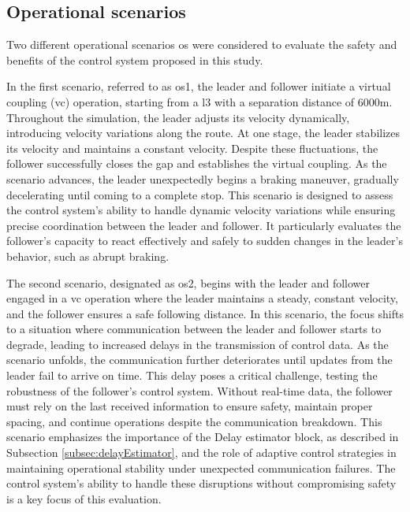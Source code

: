 \documentclass[letterpaper, 10 pt, conference]{ieeeconf}
\theoremstyle{definition}
\theoremstyle{nopoint}
\begin{document}
  		
  
  




 \subsection{Operational scenarios}
  \label{sec:OperationalScenarios}
  
  Two different operational scenarios \gls{os} were considered to evaluate the safety and benefits of the control system proposed in this study. 
  
  In the first scenario, referred to as \gls{os}1, the leader and follower initiate a virtual coupling (\gls{vc}) operation, starting from a \gls{l3} with a separation distance of $6000\unit{\meter}$. Throughout the simulation, the leader adjusts its velocity dynamically, introducing velocity variations along the route. At one stage, the leader stabilizes its velocity and maintains a constant velocity. Despite these fluctuations, the follower successfully closes the gap and establishes the virtual coupling. As the scenario advances, the leader unexpectedly begins a braking maneuver, gradually decelerating until coming to a complete stop. This scenario is designed to assess the control system’s ability to handle dynamic velocity variations while ensuring precise coordination between the leader and follower. It particularly evaluates the follower’s capacity to react effectively and safely to sudden changes in the leader’s behavior, such as abrupt braking.
  
  The second scenario, designated as \gls{os}2, begins with the leader and follower engaged in a \gls{vc} operation where the leader maintains a steady, constant velocity, and the follower ensures a safe following distance. In this scenario, the focus shifts to a situation where communication between the leader and follower starts to degrade, leading to increased delays in the transmission of control data. As the scenario unfolds, the communication further deteriorates until updates from the leader fail to arrive on time. This delay poses a critical challenge, testing the robustness of the follower’s control system. Without real-time data, the follower must rely on the last received information to ensure safety, maintain proper spacing, and continue operations despite the communication breakdown. This scenario emphasizes the importance of the Delay estimator block, as described in Subsection \ref{subsec:delayEstimator}, and the role of adaptive control strategies in maintaining operational stability under unexpected communication failures. The control system’s ability to handle these disruptions without compromising safety is a key focus of this evaluation.
  
\end{document}
